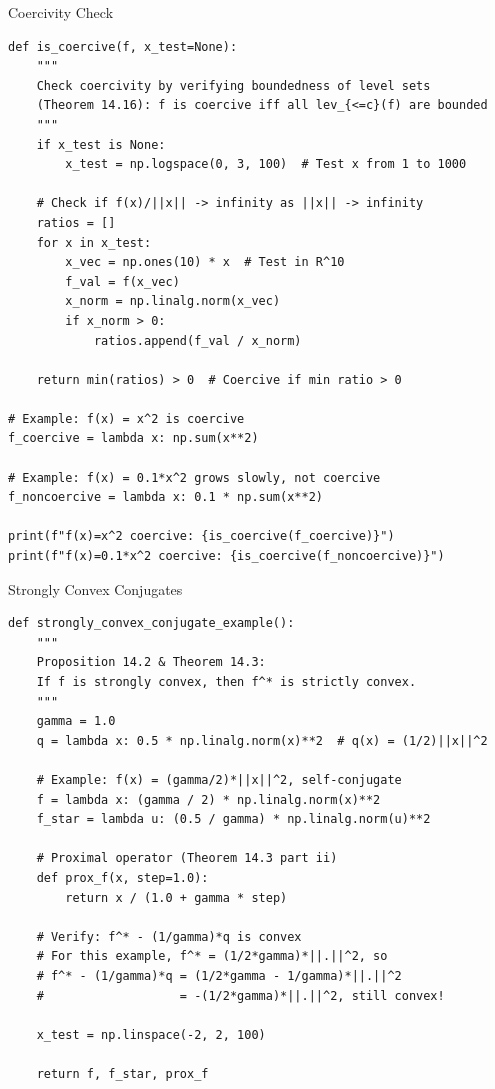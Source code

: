 \documentclass[aspectratio=169,10pt]{beamer}
\begin{document}
\begin{frame}[fragile]{Coercivity Check}
  \vspace{-0.3cm}

  \begin{lstlisting}
def is_coercive(f, x_test=None):
    """
    Check coercivity by verifying boundedness of level sets
    (Theorem 14.16): f is coercive iff all lev_{<=c}(f) are bounded
    """
    if x_test is None:
        x_test = np.logspace(0, 3, 100)  # Test x from 1 to 1000

    # Check if f(x)/||x|| -> infinity as ||x|| -> infinity
    ratios = []
    for x in x_test:
        x_vec = np.ones(10) * x  # Test in R^10
        f_val = f(x_vec)
        x_norm = np.linalg.norm(x_vec)
        if x_norm > 0:
            ratios.append(f_val / x_norm)

    return min(ratios) > 0  # Coercive if min ratio > 0

# Example: f(x) = x^2 is coercive
f_coercive = lambda x: np.sum(x**2)

# Example: f(x) = 0.1*x^2 grows slowly, not coercive
f_noncoercive = lambda x: 0.1 * np.sum(x**2)

print(f"f(x)=x^2 coercive: {is_coercive(f_coercive)}")
print(f"f(x)=0.1*x^2 coercive: {is_coercive(f_noncoercive)}")
  \end{lstlisting}
\end{frame}

\begin{frame}[fragile]{Strongly Convex Conjugates}
  \vspace{-0.3cm}

  \begin{lstlisting}
def strongly_convex_conjugate_example():
    """
    Proposition 14.2 & Theorem 14.3:
    If f is strongly convex, then f^* is strictly convex.
    """
    gamma = 1.0
    q = lambda x: 0.5 * np.linalg.norm(x)**2  # q(x) = (1/2)||x||^2

    # Example: f(x) = (gamma/2)*||x||^2, self-conjugate
    f = lambda x: (gamma / 2) * np.linalg.norm(x)**2
    f_star = lambda u: (0.5 / gamma) * np.linalg.norm(u)**2

    # Proximal operator (Theorem 14.3 part ii)
    def prox_f(x, step=1.0):
        return x / (1.0 + gamma * step)

    # Verify: f^* - (1/gamma)*q is convex
    # For this example, f^* = (1/2*gamma)*||.||^2, so
    # f^* - (1/gamma)*q = (1/2*gamma - 1/gamma)*||.||^2
    #                   = -(1/2*gamma)*||.||^2, still convex!

    x_test = np.linspace(-2, 2, 100)

    return f, f_star, prox_f
  \end{lstlisting}
\end{frame}
\end{document}
